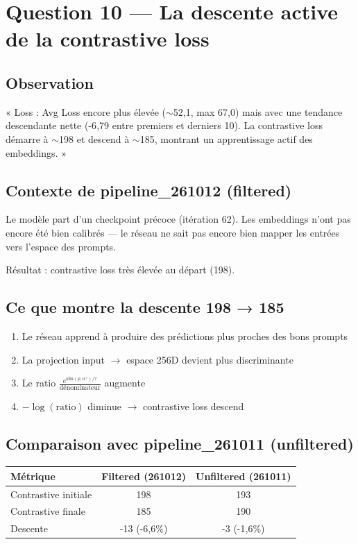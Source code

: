 \documentclass[11pt,a4paper]{article}
\begin{document}
\section{Question 10 — La descente active de la contrastive loss}

\subsection{Observation}

« Loss : Avg Loss encore plus élevée ($\sim$52{,}1, max 67{,}0) mais avec une tendance descendante nette (-6{,}79 entre premiers et derniers 10). La contrastive loss démarre à $\sim$198 et descend à $\sim$185, montrant un apprentissage actif des embeddings. »

\subsection{Contexte de pipeline\_261012 (filtered)}

Le modèle part d'un checkpoint précoce (itération 62). Les embeddings n'ont pas encore été bien calibrés — le réseau ne sait pas encore bien mapper les entrées vers l'espace des prompts.

Résultat : contrastive loss très élevée au départ (198).

\subsection{Ce que montre la descente 198 → 185}

\begin{enumerate}
    \item Le réseau apprend à produire des prédictions plus proches des bons prompts
    \item La projection input $\rightarrow$ espace 256D devient plus discriminante
    \item Le ratio $\frac{e^{\text{sim}(p, a^+)/\tau}}{\text{dénominateur}}$ augmente
    \item $-\log(\text{ratio})$ diminue $\rightarrow$ contrastive loss descend
\end{enumerate}

\subsection{Comparaison avec pipeline\_261011 (unfiltered)}

\begin{table}[h]
\centering
\begin{tabular}{lcc}
\toprule
\textbf{Métrique} & \textbf{Filtered (261012)} & \textbf{Unfiltered (261011)} \\
\midrule
Contrastive initiale & 198 & 193 \\
Contrastive finale & 185 & 190 \\
Descente & -13 (-6{,}6\%) & -3 (-1{,}6\%) \\
\bottomrule
\end{tabular}
\end{table}
\end{document}
